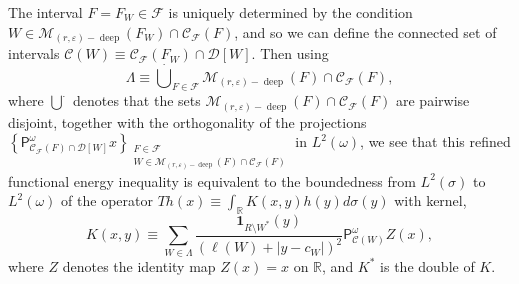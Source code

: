 \documentclass{amsart}%
\theoremstyle{plain}
\numberwithin{equation}{section}
\begin{document}
The interval $F=F_{W}\in\mathcal{F}$ is uniquely determined by the condition
$W\in\mathcal{M}_{\left(  r,\varepsilon\right)  -\operatorname*{deep}}\left(
F_{W}\right)  \cap\mathcal{C}_{\mathcal{F}}\left(  F\right)  $, and so we can
define the connected set of intervals $\mathcal{C}\left(  W\right)
\equiv\mathcal{C}_{\mathcal{F}}\left(  F_{W}\right)  \cap\mathcal{D}\left[
W\right]  $. Then using%
\[
\Lambda\equiv\overset{\cdot}{\bigcup}_{F\in\mathcal{F}}\mathcal{M}_{\left(
r,\varepsilon\right)  -\operatorname*{deep}}\left(  F\right)  \cap
\mathcal{C}_{\mathcal{F}}\left(  F\right)  ,
\]
where $\overset{\cdot}{\bigcup}$ denotes that the sets $\mathcal{M}_{\left(
r,\varepsilon\right)  -\operatorname*{deep}}\left(  F\right)  \cap
\mathcal{C}_{\mathcal{F}}\left(  F\right)  $ are pairwise disjoint, together
with the orthogonality of the projections $\left\{  \mathsf{P}_{\mathcal{C}%
_{\mathcal{F}}\left(  F\right)  \cap\mathcal{D}\left[  W\right]  }^{\omega
}x\right\}  _{\substack{F\in\mathcal{F} \\W\in\mathcal{M}_{\left(
r,\varepsilon\right)  -\operatorname*{deep}}\left(  F\right)  \cap
\mathcal{C}_{\mathcal{F}}\left(  F\right)  }}$ in $L^{2}\left(  \omega\right)
$, we see that this refined functional energy inequality is equivalent to the
boundedness from $L^{2}\left(  \sigma\right)  $ to $L^{2}\left(
\omega\right)  $ of the operator $Th\left(  x\right)  \equiv\int_{\mathbb{R}%
}K\left(  x,y\right)  h\left(  y\right)  d\sigma\left(  y\right)  $ with
kernel,
\begin{equation}
K\left(  x,y\right)  \equiv\sum_{W\in\Lambda}\frac{\mathbf{1}_{R\setminus
W^{\ast}}\left(  y\right)  }{\left(  \ell\left(  W\right)  +\left\vert
y-c_{W}\right\vert \right)  ^{2}}\mathsf{P}_{\mathcal{C}\left(  W\right)
}^{\omega}Z\left(  x\right)  ,\label{def K}%
\end{equation}
where $Z$ denotes the identity map $Z\left(  x\right)  =x$ on $\mathbb{R}$,
and $K^{\ast}$ is the double of $K$.
\end{document}
